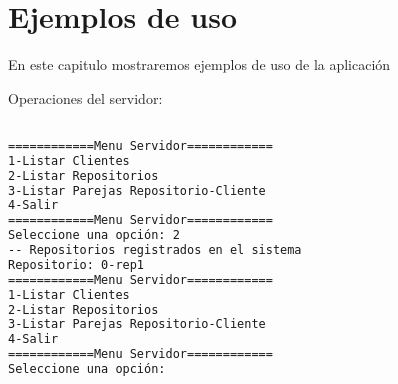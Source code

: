 \chapter{Ejemplos de uso}

En este capitulo mostraremos ejemplos de uso de la aplicación

Operaciones del servidor:

\begin{lstlisting}[language=bash]

============Menu Servidor============
1-Listar Clientes
2-Listar Repositorios
3-Listar Parejas Repositorio-Cliente
4-Salir
============Menu Servidor============
Seleccione una opción: 2
-- Repositorios registrados en el sistema
Repositorio: 0-rep1
============Menu Servidor============
1-Listar Clientes
2-Listar Repositorios
3-Listar Parejas Repositorio-Cliente
4-Salir
============Menu Servidor============
Seleccione una opción:

\end{lstlisting}